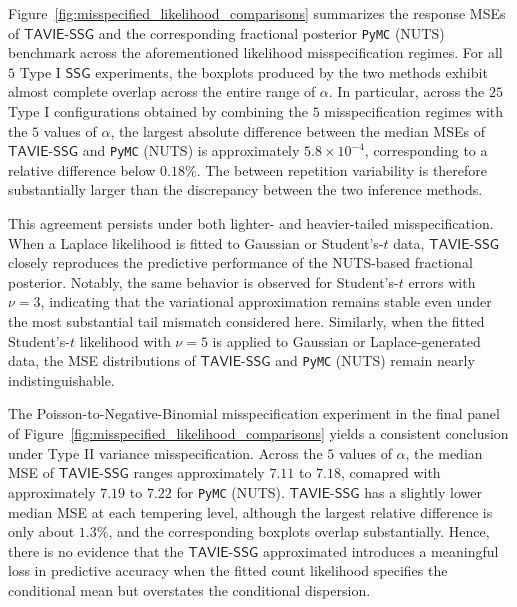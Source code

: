 \documentclass[12pt]{article}
\numberwithin{equation}{section}
\newcommand{\ssg}{\mathsf{SSG}}
\newcommand{\tssg}{\mathsf{TAVIE}\text{-}\mathsf{SSG}}
\begin{document}
Figure~\ref{fig:misspecified_likelihood_comparisons} summarizes the response MSEs of $\tssg$ and the corresponding fractional posterior \texttt{PyMC} (NUTS) benchmark across the aforementioned likelihood misspecification regimes. For all $5$ Type I $\ssg$ experiments, the boxplots produced by the two methods exhibit almost complete overlap across the entire range of $\alpha$. In particular, across the $25$ Type I configurations obtained by combining the $5$ misspecification regimes with the $5$ values of $\alpha$, the largest absolute difference between the median MSEs of $\tssg$ and \texttt{PyMC} (NUTS) is approximately $5.8\times 10^{-4}$, corresponding to a relative difference below $0.18\%$. The between repetition variability is therefore substantially larger than the discrepancy between the two inference methods.

This agreement persists under both lighter- and heavier-tailed misspecification. When a Laplace likelihood is fitted to Gaussian or Student's-$t$ data, $\tssg$ closely reproduces the predictive performance of the NUTS-based fractional posterior. Notably, the same behavior is observed for Student's-$t$ errors with $\nu=3$, indicating that the variational approximation remains stable even under the most substantial tail mismatch considered here. Similarly, when the fitted Student's-$t$ likelihood with $\nu=5$ is applied to Gaussian or Laplace-generated data, the MSE distributions of $\tssg$ and \texttt{PyMC} (NUTS) remain nearly indistinguishable.

The Poisson-to-Negative-Binomial misspecification experiment in the final panel of Figure~\ref{fig:misspecified_likelihood_comparisons} yields a consistent conclusion under Type II variance misspecification. Across the $5$ values of $\alpha$, the median MSE of $\tssg$ ranges approximately $7.11$ to $7.18$, comapred with approximately $7.19$ to $7.22$ for \texttt{PyMC} (NUTS). $\tssg$ has a slightly lower median MSE at each tempering level, although the largest relative difference is only about $1.3\%$, and the corresponding boxplots overlap substantially. Hence, there is no evidence that the $\tssg$ approximated introduces a meaningful loss in predictive accuracy when the fitted count likelihood specifies the conditional mean but overstates the conditional dispersion.
\end{document}
